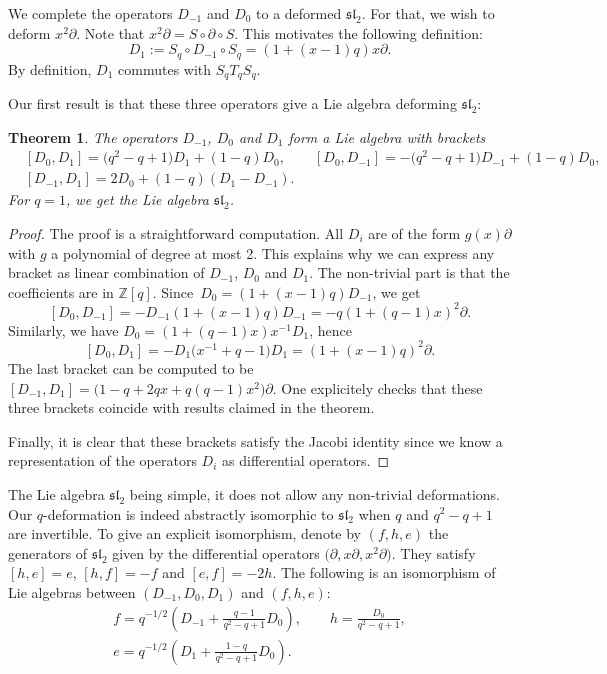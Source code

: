 \documentclass[10pt,a4paper]{amsart}
\numberwithin{equation}{section}
\newtheorem{Theorem}{Theorem}[section]
\newcommand*{\Z}{\mathbb{Z}}
\begin{document}
We complete the operators $D_{-1}$ and $D_0$ to a deformed $\mathfrak{sl}_2$. For that, we wish to deform $x^2\partial$.
Note that $x^2\partial = S\circ \partial\circ S$. This motivates the following definition:
\[
D_1:=S_q\circ D_{-1}\circ S_q=(1+(x-1)q)x\partial.
\]
By definition, $D_1$ commutes with $S_qT_qS_q$.

Our first result is that these three operators give a Lie algebra deforming $\mathfrak{sl}_2$:

\begin{Theorem}\label{Prop:deformed-sl2}
The operators $D_{-1}$, $D_0$ and $D_1$ form a Lie algebra with brackets
\begin{align*}
&[D_0,D_1]= \big(q^2-q+1\big)D_1+(1-q)D_0, \qquad
[D_0,D_{-1}] = -\big(q^2-q+1\big)D_{-1}+(1-q)D_0, \\
&[D_{-1},D_1]= 2D_0+(1-q)(D_{1}-D_{-1}).
\end{align*}
For $q=1$, we get the Lie algebra $\mathfrak{sl}_2$.
\end{Theorem}



\begin{proof}
The proof is a straightforward computation. All $D_i$ are of the form $g(x)\partial$ with $g$ a polynomial of degree at most 2. This explains why we can express any bracket as linear combination of $D_{-1}$, $D_0$ and $D_1$. The non-trivial part is that the coefficients are in $\Z[q]$.
Since~${D_0=(1+(x-1)q)D_{-1}}$, we get
\[[D_0,D_{-1}]=-D_{-1}(1+(x-1)q)D_{-1}=-q(1+(q-1)x)^2\partial.
\]
Similarly, we have $D_0=(1+(q-1)x)x^{-1}D_1$, hence
\[
[D_0,D_1]=-D_1\big(x^{-1}+q-1\big)D_1=(1+(x-1)q)^2\partial.
\]
The last bracket can be computed to be $[D_{-1},D_1]=\big(1-q+2qx+q(q-1)x^2\big)\partial$. One explicitely checks that these three brackets coincide with results claimed in the theorem.

Finally, it is clear that these brackets satisfy the Jacobi identity since we know a representation of the operators $D_i$ as differential operators.
\end{proof}


The Lie algebra $\mathfrak{sl}_2$ being simple, it does not allow any non-trivial deformations. Our $q$-deformation is indeed abstractly isomorphic to $\mathfrak{sl}_2$ when $q$ and $q^2-q+1$ are invertible. To give an explicit isomorphism, denote by $(f,h,e)$ the generators of $\mathfrak{sl}_2$ given by the differential operators $\big(\partial, x\partial, x^2\partial\big)$. They satisfy $[h,e]=e$, $[h,f]=-f$ and $[e,f]=-2h$. The following is an isomorphism of Lie algebras between $(D_{-1},D_0,D_1)$ and $(f,h,e)$:
\begin{gather*}%
f=q^{-1/2}\left(D_{-1}+\frac{q-1}{q^2-q+1}D_0\right), \qquad h=\frac{D_0}{q^2-q+1}, \\
 e=q^{-1/2}\left(D_1+\frac{1-q}{q^2-q+1}D_0\right).
\end{gather*}
\end{document}
